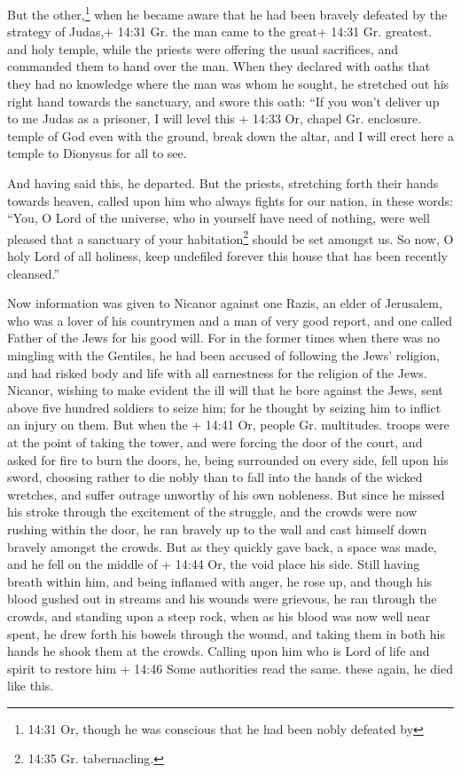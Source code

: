 But the other,\footnote{14:31 Or, though he was conscious
  that he had been nobly defeated by} when he became aware that he had
been bravely defeated by the strategy of Judas,+ 14:31 Gr. the man came
to the great+ 14:31 Gr. greatest. and holy temple, while the priests
were offering the usual sacrifices, and commanded them to hand over the
man.  When they declared with oaths that they had no
knowledge where the man was whom he sought,  he stretched
out his right hand towards the sanctuary, and swore this oath: ``If you
won't deliver up to me Judas as a prisoner, I will level this + 14:33
Or, chapel Gr. enclosure. temple of God even with the ground, break down
the altar, and I will erect here a temple to Dionysus for all to see.

 And having said this, he departed. But the priests,
stretching forth their hands towards heaven, called upon him who always
fights for our nation, in these words:  ``You, O Lord of
the universe, who in yourself have need of nothing, were well pleased
that a sanctuary of your habitation\footnote{14:35 Gr. tabernacling.}
should be set amongst us.  So now, O holy Lord of all
holiness, keep undefiled forever this house that has been recently
cleansed.''

 Now information was given to Nicanor against one Razis, an
elder of Jerusalem, who was a lover of his countrymen and a man of very
good report, and one called Father of the Jews for his good will.
 For in the former times when there was no mingling with
the Gentiles, he had been accused of following the Jews' religion, and
had risked body and life with all earnestness for the religion of the
Jews.  Nicanor, wishing to make evident the ill will that
he bore against the Jews, sent above five hundred soldiers to seize him;
 for he thought by seizing him to inflict an injury on
them.  But when the + 14:41 Or, people Gr. multitudes.
troops were at the point of taking the tower, and were forcing the door
of the court, and asked for fire to burn the doors, he, being surrounded
on every side, fell upon his sword,  choosing rather to die
nobly than to fall into the hands of the wicked wretches, and suffer
outrage unworthy of his own nobleness.  But since he missed
his stroke through the excitement of the struggle, and the crowds were
now rushing within the door, he ran bravely up to the wall and cast
himself down bravely amongst the crowds.  But as they
quickly gave back, a space was made, and he fell on the middle of +
14:44 Or, the void place his side.  Still having breath
within him, and being inflamed with anger, he rose up, and though his
blood gushed out in streams and his wounds were grievous, he ran through
the crowds, and standing upon a steep rock,  when as his
blood was now well near spent, he drew forth his bowels through the
wound, and taking them in both his hands he shook them at the crowds.
Calling upon him who is Lord of life and spirit to restore him + 14:46
Some authorities read the same. these again, he died like this.

